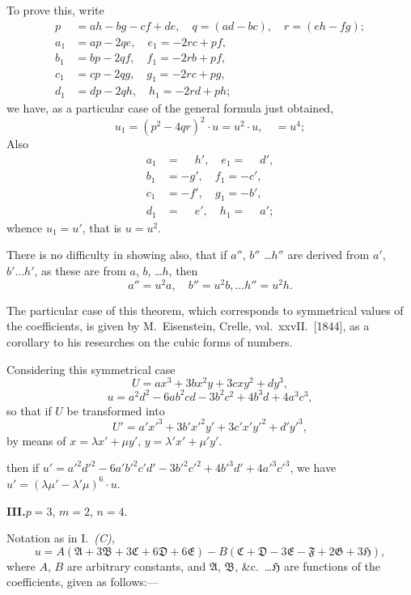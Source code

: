 \documentclass[11pt,a4paper]{book}
\begin{document}
To prove this, write
\begin{align*}
p &= ah - bg - cf + de, \quad q = (ad - bc), \quad r = (eh - fg);\\
a_1 &= ap - 2qe, \quad e_1 = -2rc + pf, \\
b_1 &= bp - 2qf, \quad f_1 = -2rb + pf, \\
c_1 &= cp - 2qg, \quad g_1 = -2rc + pg, \\
d_1 &= dp - 2qh, \quad h_1 = -2rd + ph;
\end{align*}
we have, as a particular case of the general formula just obtained,
\[
u_1 = (p^2 - 4qr)^2 \cdot u = u^2 \cdot u, \quad = u^4;
\]
Also
\begin{align*}
a_1 &= \phantom{-}h', \quad e_1 = \phantom{-}d', \\
b_1 &= -g', \quad f_1 = -c', \\
c_1 &= -f', \quad g_1 = -b', \\
d_1 &= \phantom{-}e', \quad h_1 = \phantom{-}a';
\end{align*}
whence $u_1 = u'$, that is $u = u^2$.

There is no difficulty in showing also, that if $a''$, $b''$ \ldots $h''$ are derived from
$a'$, $b' \ldots h'$, as these are from $a$, $b$, \ldots $h$, then
\[
a'' = u^2 a, \quad b'' = u^2 b, \ldots h'' = u^2 h.
\]

The particular case of this theorem, which corresponds to symmetrical values of the
coefficients, is given by M.~Eisenstein, Crelle, vol.~xxvII.\ [1844], as a corollary to his
researches on the cubic forms of numbers.

Considering this symmetrical case
\[
U = ax^3 + 3bx^2y + 3cxy^2 + dy^3,
\]
\[
u = a^2d^2 - 6ab^2cd - 3b^2c^2 + 4b^3d + 4a^3c^3,
\]
so that if $U$ be transformed into
\[
U' = a'x'^3 + 3b'x'^2y' + 3c'x'y'^2 + d'y'^3,
\]
by means of $x = \lambda x' + \mu y'$,
$y = \lambda' x' + \mu' y'$.

then if $u' = a'^2d'^2 - 6a'b'^2c'd' - 3b'^2c'^2 + 4b'^3d' + 4a'^3c'^3$,
we have $u' = (\lambda\mu' - \lambda'\mu)^6 \cdot u$.

\newpage
\textbf{III.}\quad $p=3$, $m=2$, $n=4$.

Notation as in I.\ \textit{(C)},
\[
u = A(\mathfrak{A} + 3\mathfrak{B} + 3\mathfrak{C} + 6\mathfrak{D} + 6\mathfrak{E}) - B(\mathfrak{C} + \mathfrak{D} - 3\mathfrak{E} - \mathfrak{F} + 2\mathfrak{G} + 3\mathfrak{H}),
\]
where $A$, $B$ are arbitrary constants, and $\mathfrak{A}$, $\mathfrak{B}$, \&c.\ \ldots $\mathfrak{H}$ are functions of the coefficients,
given as follows:---
\end{document}
